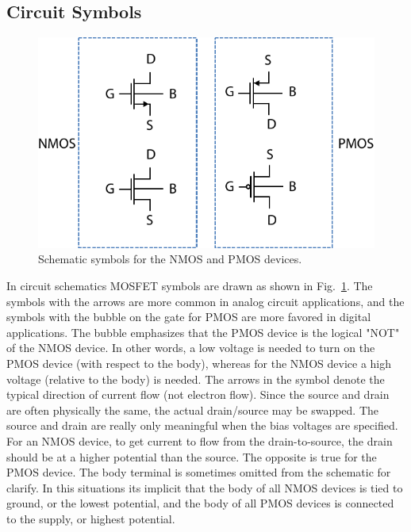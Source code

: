 \subsection{Circuit Symbols}
\begin{figure}[tb]
\centering
\includegraphics[width=.6\columnwidth]{mos_symbols}
\caption{Schematic symbols for the NMOS and PMOS devices.}
\label{fig:mos_symbols}
\end{figure}
In circuit schematics MOSFET symbols are drawn as shown in Fig.~\ref{fig:mos_symbols}.  The symbols with the arrows are more common in analog circuit applications, and the symbols with the bubble on the gate for PMOS are more favored in digital applications.  The bubble emphasizes that the PMOS device is the logical "NOT" of the NMOS device. In other words, a low voltage is needed to turn on the PMOS device (with respect to the body), whereas for the NMOS device a high voltage (relative to the body) is needed.  The arrows in the symbol denote the typical direction of current flow (not electron flow).  Since the source and drain are often physically the same, the actual drain/source may be swapped.  The source and drain are really only meaningful when the bias voltages are specified. For an NMOS device, to get current to flow from the drain-to-source, the drain should be at a higher potential than the source.  The opposite is true for the PMOS device.
The body terminal is sometimes omitted from the schematic for clarify.  In this situations its implicit that the body of all NMOS devices is tied to ground, or the lowest potential, and the body of all PMOS devices is connected to the supply, or highest potential.
